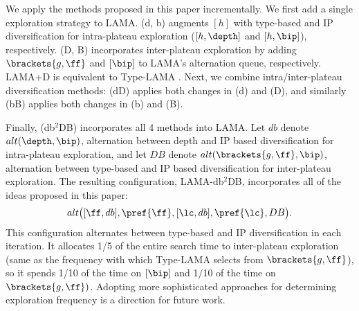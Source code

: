 
We apply the methods proposed in this paper incrementally.
We first add a single exploration strategy to LAMA.
(d, b) augments $[h]$ with type-based and IP diversification for intra-plateau exploration ($[h,\depth]$ and $[h,\bip]$), respectively.
(D, B) incorporates inter-plateau exploration by adding $\brackets{g,\ff}$ and $[\bip]$ to LAMA's alternation queue, respectively.
LAMA+D is equivalent to Type-LAMA \cite{xie14type}.
Next, we combine intra/inter-plateau diversification methods:
(dD) applies both changes in (d) and (D), and similarly (bB) applies both changes in (b) and (B).

Finally, (db$^2$DB) incorporates all 4 methods into LAMA.
Let $db$ denote $alt(\depth,\bip)$, alternation between depth and IP based diversification for intra-plateau exploration,
and let $DB$ denote $alt(\brackets{g,\ff},\bip)$, alternation between type-based and IP based diversification for inter-plateau exploration.
The resulting configuration,
LAMA-db$^2$DB, incorporates all of the ideas proposed in this paper:
 \[ alt\big([\ff,db], \pref{\ff}, [\lc,db], \pref{\lc}, DB\big). \]
This configuration alternates between type-based and IP diversification in each iteration.
It allocates 1/5 of the entire search time to inter-plateau exploration 
(same as the frequency with which Type-LAMA selects from $\brackets{g,\ff}$),
so it spends 1/10 of the time on $[\bip]$ and 1/10 of the time on $\brackets{g,\ff})$.
Adopting more sophisticated approaches for determining exploration frequency \cite{schulte2014balancing,nakhost2009monte} is a direction for future work.



